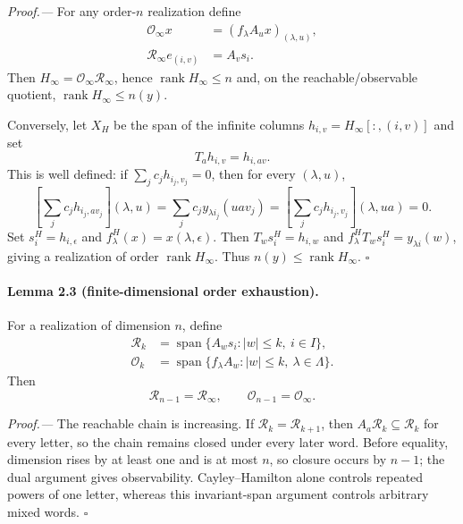 \documentclass[aps,prl,reprint,superscriptaddress,nofootinbib]{revtex4-2}
\newcommand{\rank}{\operatorname{rank}}
\newcommand{\cR}{\mathcal R}
\newcommand{\cO}{\mathcal O}
\begin{document}
\emph{Proof.---}
For any order-$n$ realization define
\begin{align}
 \cO_\infty x&=(f_\lambda A_ux)_{(\lambda,u)},\nonumber\\
 \cR_\infty e_{(i,v)}&=A_vs_i.
\end{align}
Then $H_\infty=\cO_\infty\cR_\infty$, hence $\rank H_\infty\le n$ and, on the reachable/observable quotient, $\rank H_\infty\le n(y)$.

Conversely, let $X_H$ be the span of the infinite columns $h_{i,v}=H_\infty[:,(i,v)]$ and set
\begin{equation}
 T_ah_{i,v}=h_{i,av}.
 \label{eq:canonical-shift}
\end{equation}
This is well defined: if $\sum_jc_jh_{i_j,v_j}=0$, then for every $(\lambda,u)$,
\begin{equation}
 \left[\sum_jc_jh_{i_j,av_j}\right](\lambda,u)
 =\sum_jc_jy_{\lambda i_j}(uav_j)
 =\left[\sum_jc_jh_{i_j,v_j}\right](\lambda,ua)=0.
\end{equation}
Set $s_i^H=h_{i,\epsilon}$ and $f_\lambda^H(x)=x(\lambda,\epsilon)$.  Then $T_ws_i^H=h_{i,w}$ and $f_\lambda^HT_ws_i^H=y_{\lambda i}(w)$, giving a realization of order $\rank H_\infty$.  Thus $n(y)\le\rank H_\infty$. \hfill$\square$

\paragraph{Lemma 2.3 (finite-dimensional order exhaustion).}
For a realization of dimension $n$, define
\begin{align}
 \cR_k&=\operatorname{span}\{A_ws_i:|w|\le k,\ i\in I\},\nonumber\\
 \cO_k&=\operatorname{span}\{f_\lambda A_w:|w|\le k,\ \lambda\in\Lambda\}.
 \label{eq:ROchains}
\end{align}
Then
\begin{equation}
 \cR_{n-1}=\cR_\infty,
 \qquad \cO_{n-1}=\cO_\infty.
 \label{eq:order-exhaustion}
\end{equation}

\emph{Proof.---}
The reachable chain is increasing.  If $\cR_k=\cR_{k+1}$, then $A_a\cR_k\subseteq\cR_k$ for every letter, so the chain remains closed under every later word.  Before equality, dimension rises by at least one and is at most $n$, so closure occurs by $n-1$; the dual argument gives observability.  Cayley--Hamilton alone controls repeated powers of one letter, whereas this invariant-span argument controls arbitrary mixed words. \hfill$\square$
\end{document}
